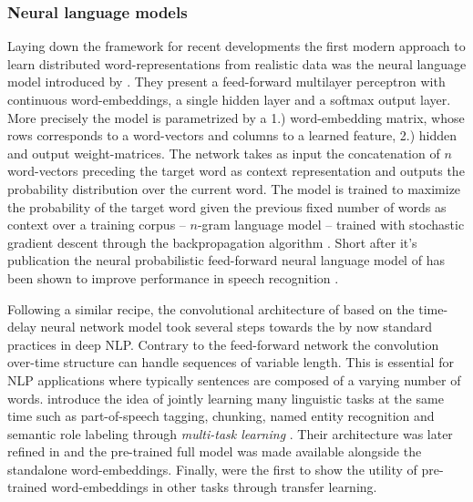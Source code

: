 \subsubsection{Neural language models}
\label{sec:NNLM}
Laying down the framework for recent developments the first modern approach to learn
distributed word-representations from realistic data
was the neural language model introduced by \cite{bengio2003neural}.
They present a feed-forward multilayer perceptron with continuous word-embeddings,
a single hidden layer and a softmax output layer.
More precisely the model is parametrized by a 1.) word-embedding matrix, 
whose rows corresponds to a word-vectors
and columns to a learned feature, 2.)
hidden and output weight-matrices. 
The network takes as input the concatenation of $n$ word-vectors preceding the target word as context
representation and outputs the probability distribution over the current word.
The model is trained to maximize the probability of
the target word given the previous fixed number of words as context over a training corpus
-- $n$-gram language model -- trained with stochastic gradient descent \citep{cauchy1847methode}
through the backpropagation algorithm \citep{rumelhart1985learning}.
Short after it's publication the neural probabilistic feed-forward neural language model of  \cite{bengio2003neural} 
has been shown to improve performance in speech recognition \citep{schwenk2005training}.




Following a similar recipe, the convolutional architecture of \cite{collobert2008unified}
based on the time-delay neural network model \citep{waibel1990phoneme} took several steps towards the
by now standard practices in deep NLP.
Contrary to the feed-forward network the convolution over-time structure can handle
sequences of variable length. This is essential for NLP applications where typically sentences
are composed of a varying number of words.
\cite{collobert2008unified} introduce the idea of jointly learning many linguistic tasks at the same time such as part-of-speech
tagging, chunking, named entity recognition and semantic role labeling through \emph{multi-task learning} 
\citep{caruana1997multitask}.
Their architecture was later refined in \cite{collobert2011natural} and the pre-trained
full model was made available alongside the standalone word-embeddings.
Finally, \cite{collobert2008unified} were the first to show the utility of pre-trained word-embeddings
in other tasks through transfer learning.

